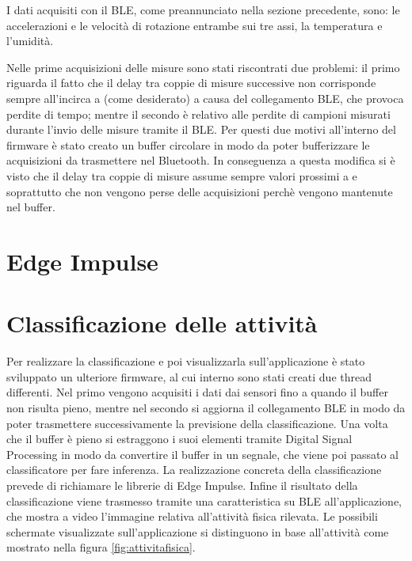 I dati acquisiti con il BLE, come preannunciato nella sezione precedente, sono: le accelerazioni e le velocità di rotazione entrambe sui tre assi, la temperatura e l'umidità. 

Nelle prime acquisizioni delle misure sono stati riscontrati due problemi: il primo riguarda il fatto che il delay tra coppie di misure successive non corrisponde sempre all'incirca a %
(come desiderato) a causa del collegamento BLE, che provoca perdite di tempo; mentre il secondo è relativo alle perdite di campioni  misurati durante l'invio delle misure tramite il BLE. Per questi due motivi all'interno del firmware è stato creato un buffer circolare in modo da poter bufferizzare le acquisizioni da trasmettere nel Bluetooth. In conseguenza a questa modifica si è visto che il delay tra coppie di misure assume sempre valori prossimi a %
e soprattutto che non vengono perse delle acquisizioni perchè vengono mantenute nel buffer.



\section{Edge Impulse}

\section{Classificazione delle attività}
Per realizzare la classificazione e poi visualizzarla sull'applicazione è stato sviluppato un ulteriore firmware, al cui interno sono stati creati due thread differenti. Nel primo vengono acquisiti i dati dai sensori fino a quando il buffer non risulta pieno, mentre nel secondo si aggiorna il collegamento BLE in modo da poter trasmettere successivamente la previsione della classificazione. Una volta che il buffer è pieno si estraggono i suoi elementi tramite Digital Signal Processing in modo da convertire il buffer in un segnale, che viene poi passato al classificatore per fare inferenza. La realizzazione concreta della classificazione prevede di richiamare le librerie di Edge Impulse. Infine il risultato della classificazione viene trasmesso tramite una caratteristica su BLE all'applicazione, che mostra a video l'immagine relativa all'attività fisica rilevata. Le possibili schermate visualizzate sull'applicazione si distinguono in base all'attività come mostrato nella figura \ref{fig:attivitafisica}.

